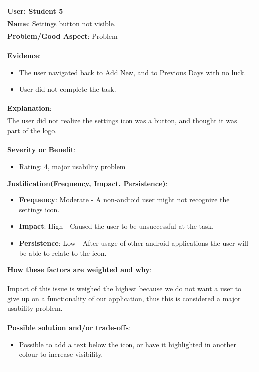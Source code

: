 \documentclass[pdftex,12pt,a4paper]{report}
\begin{document}
\begin{center}
	\begin{tabular}{|p{\textwidth}|}
	\hline
	\textbf{User}: Student 5\\
	\hline
	\textbf{Name}: Settings button not visible.\\
	\hline
	\textbf{Problem/Good Aspect}: Problem\\
	\hline
	\textbf{Evidence}:
	\begin{itemize}
	\item{The user navigated back to Add New, and to Previous Days with no luck.}
	\item{User did not complete the task.}
	\end{itemize}\\
	\hline
	\textbf{Explanation}:\\
	The user did not realize the settings icon was a button, and thought it was part of the logo.\\
	\hline
\textbf{Severity or Benefit}:
	\begin{itemize}
	\item{Rating: 4, major usability problem}
	\end{itemize}
	\textbf{Justification(Frequency, Impact, Persistence)}:
	\begin{itemize}
	\item{\textbf{Frequency}:} Moderate - A non-android user might not recognize the settings icon.
	\item{\textbf{Impact}:} High - Caused the user to be unsuccessful at the task.
	\item{\textbf{Persistence}:} Low - After usage of other android applications the user will be able to relate to the icon.
	\end{itemize}
	\textbf{How these factors are weighted and why}:\\
	Impact of this issue is weighed the highest because we do not want a user to give up on a functionality of our application, thus this is considered a major usability problem.\\
	\hline
	\textbf{Possible solution and/or trade-offs}:
	\begin{itemize}
	\item{Possible to add a text below the icon, or have it highlighted in another colour to increase visibility.}
	\end{itemize}\\
	\hline
	\end{tabular}
\end{center}
\end{document}
